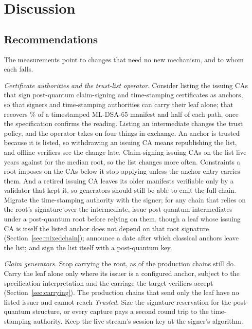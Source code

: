 \section{Discussion}
\label{sec:discussion}

\subsection{Recommendations}
\label{sec:recommendations}

The measurements point to changes that need no new mechanism, and to whom
each falls.

\emph{Certificate authorities and the trust-list operator.} Consider listing
the issuing CAs that sign post-quantum claim-signing and time-stamping
certificates as anchors, so that signers and time-stamping authorities can
carry their leaf alone; that recovers \NtsBothLeafPct\% of a timestamped
ML-DSA-65 manifest and half of each path, once the specification confirms the
reading. Listing an intermediate changes the trust policy, and the operator
takes on four things in exchange. An anchor is
trusted because it is listed, so withdrawing an issuing CA means republishing
the list, and offline verifiers see the change late. Claim-signing issuing CAs
on the list live \NtlIcaYearsHi{} years against \NtlRootYearsMed{} for the
median root, so the list changes more often. Constraints a root imposes on the CAs below it stop
applying unless the anchor entry carries them. And a retired issuing CA leaves
its older manifests verifiable only by a validator that kept it, so generators
should still be able to emit the full chain. Migrate the time-stamping
authority with the signer; for any chain that relies on the root's signature
over the intermediate, issue post-quantum intermediates under a post-quantum
root before relying on them, though a leaf whose issuing CA is itself the
listed anchor does not depend on that root signature
(Section~\ref{sec:mixedchain}); announce a date after which classical anchors
leave the list; and sign the list itself with a post-quantum key.

\emph{Claim generators.} Stop carrying the root, as \NcorpProdRoot{} of the
\NcorpProdChains{} production chains still do. Carry the leaf alone only where
its issuer is a configured anchor, subject to the specification interpretation
and the carriage the target verifiers accept (Section~\ref{sec:carrying}). The
\NcorpProdOneCert{} production chains that send only the leaf have no listed
issuer and cannot reach \emph{Trusted}.
Size the signature reservation for the post-quantum structure, or every
capture pays a second round trip to the time-stamping authority. Keep the live
stream's session key at the signer's algorithm.

